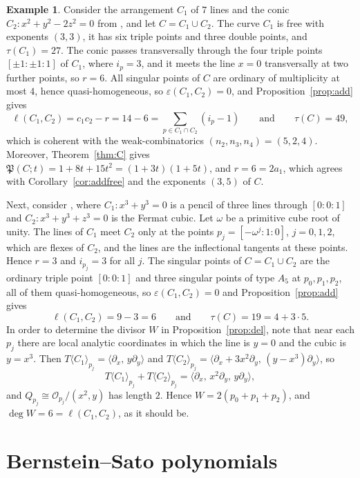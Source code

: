 \documentclass[11pt]{amsart}
\theoremstyle{definition}
\newtheorem{example}[theorem]{Example}
\numberwithin{equation}{section}
\newcommand{\cO}{\mathcal{O}}
\newcommand{\Pfrak}{\mathfrak{P}}
\begin{document}
\begin{example}\label{ex:addition}
Consider the arrangement $C_1$ of $7$ lines and the conic $C_2\colon x^2+y^2-2z^2=0$
from \cite[Example~3.4]{Po24}, and let $C=C_1\cup C_2$.
The curve $C_1$ is free with exponents $(3,3)$, it has six triple points and three double
points, and $\tau(C_1)=27$.
The conic passes transversally through the four triple points $[\pm1:\pm1:1]$ of $C_1$,
where $i_p=3$, and it meets the line $x=0$ transversally at two further points, so $r=6$.
All singular points of $C$ are ordinary of multiplicity at most $4$, hence quasi-homogeneous,
so $\varepsilon(C_1,C_2)=0$, and Proposition~\ref{prop:add} gives
\[
\ell(C_1,C_2)=c_1c_2-r=14-6=\sum_{p\in C_1\cap C_2}(i_p-1)
\qquad\text{and}\qquad
\tau(C)= 49,
\]
which is coherent with the weak-combinatorics $(n_2,n_3,n_4)=(5,2,4)$.
Moreover, Theorem~\ref{thm:C} gives $\Pfrak(C;t)=1+8t+15t^2=(1+3t)(1+5t)$, and
$r=6=2a_1$, which agrees with Corollary~\ref{cor:addfree} and the exponents $(3,5)$ of $C$.

Next, consider \cite[Example~3.5]{Po24}, where $C_1\colon x^3+y^3=0$ is a pencil of three
lines through $[0:0:1]$ and $C_2\colon x^3+y^3+z^3=0$ is the Fermat cubic.
Let $\omega$ be a primitive cube root of unity.
The lines of $C_1$ meet $C_2$ only at the points $p_j=[-\omega^j:1:0]$, $j=0,1,2$, which are
flexes of $C_2$, and the lines are the inflectional tangents at these points.
Hence $r=3$ and $i_{p_j}=3$ for all $j$.
The singular points of $C=C_1\cup C_2$ are the ordinary triple point $[0:0:1]$ and three
singular points of type $A_5$ at $p_0,p_1,p_2$, all of them quasi-homogeneous, so
$\varepsilon(C_1,C_2)=0$ and Proposition~\ref{prop:add} gives
\[
\ell(C_1,C_2)=9-3=6
\qquad\text{and}\qquad
\tau(C)=19=4+3\cdot5 .
\]
In order to determine the divisor $W$ in Proposition~\ref{prop:del}, note that near each
$p_j$ there are local analytic coordinates in which the line is $y=0$ and the cubic is $y=x^3$.
Then $T\langle C_1\rangle_{p_j}=\langle\partial_x,\,y\partial_y\rangle$ and
$T\langle C_2\rangle_{p_j}=\langle\partial_x+3x^2\partial_y,\,(y-x^3)\partial_y\rangle$, so
\[
T\langle C_1\rangle_{p_j}+T\langle C_2\rangle_{p_j}=\langle\partial_x,\,x^2\partial_y,\,y\partial_y\rangle,
\]
and $Q_{p_j}\cong\cO_{p_j}/(x^2,y)$ has length $2$.
Hence $W=2(p_0+p_1+p_2)$, and $\deg W=6=\ell(C_1,C_2)$, as it should be.
\end{example}

\section{Bernstein--Sato polynomials}\label{sec:BS}
\end{document}
